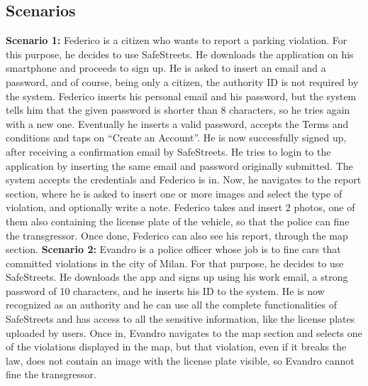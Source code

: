 \documentclass[../RASD.tex]{subfiles}
\begin{document}
            \subsection{Scenarios}\label{subsec:scenarios}
                \textbf{Scenario 1:} Federico is a citizen who wants to report a parking violation.
                For this purpose, he decides to use SafeStreets.
                He downloads the application on his smartphone and proceeds to sign up.
                He is asked to insert an email and a password, and of course, being only a citizen, the authority ID is not required by the system.
                Federico inserts his personal email and his password, but the system tells him that the given password is shorter than 8 characters,
                so he tries again with a new one.
                Eventually he inserts a valid password, accepts the Terms and conditions and taps on “Create an Account”.
                He is now successfully signed up, after receiving a confirmation email by SafeStreets.
                He tries to login to the application by inserting the same email
                and password originally submitted.
                The system accepts the credentials and Federico is in.
                Now, he navigates to the report section, where he is asked to
                insert one or more images and select the type of violation, and optionally write a note.
                Federico takes and insert 2 photos, one of them also containing
                the license plate of the vehicle, so that the police can fine the transgressor.
                Once done, Federico can also see his report, through the map section.
                \newline
                \newline
                \textbf{Scenario 2:} Evandro is a police officer whose job is to fine cars that committed violations in the city of Milan.
                For that purpose, he decides to use SafeStreets.
                He downloads the app and signs up using his work email, a strong password of 10 characters, and he inserts his ID to the system.
                He is now recognized as an authority and he can use all the complete functionalities of SafeStreets and has access to all the sensitive information,
                like the license plates uploaded by users.
                Once in, Evandro navigates to the map section and selects one of the violations displayed in the map, but that violation,
                even if it breaks the law, does not contain an image with the license plate visible, so Evandro cannot fine the transgressor.
\end{document}
